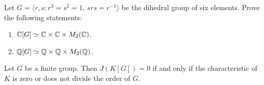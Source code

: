\begin{exercise}
	Let $G=\langle r,s:r^3=s^2=1,\,srs=r^{-1}\rangle$ be the dihedral group of six elements. 
	Prove the following statements:
	\begin{enumerate}
	    \item $\mathbb{C}[G]\simeq\mathbb{C}\times\mathbb{C}\times M_2(\mathbb{C})$.
	    \item $\mathbb{Q}[G]\simeq\mathbb{Q}\times\mathbb{Q}\times M_2(\mathbb{Q})$.
	\end{enumerate}  
\end{exercise}

\begin{theorem}[Maschke]
	Let $G$ be a finite group. Then $J(K[G])=0$ if and only if the characteristic of $K$ is zero 
	or does not divide the order of $G$. 
\end{theorem}

